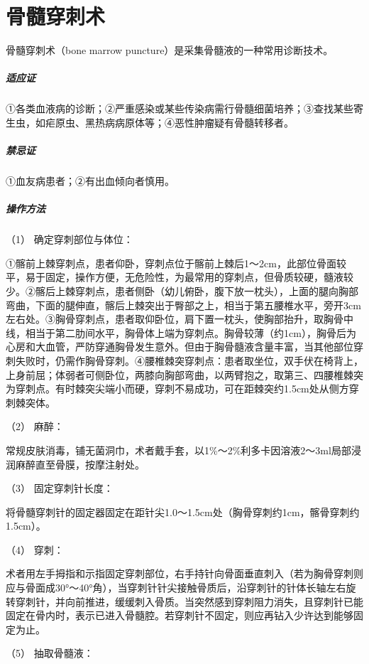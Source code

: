 \section{骨髓穿刺术}

骨髓穿刺术（bone marrow puncture）是采集骨髓液的一种常用诊断技术。

\subparagraph{适应证}

①各类血液病的诊断；②严重感染或某些传染病需行骨髓细菌培养；③查找某些寄生虫，如疟原虫、黑热病病原体等；④恶性肿瘤疑有骨髓转移者。

\subparagraph{禁忌证}

①血友病患者；②有出血倾向者慎用。

\subparagraph{操作方法}

\hypertarget{text00379.htmlux5cux23CHP16-7-3-3-1}{}
（1） 确定穿刺部位与体位：

①髂前上棘穿刺点，患者仰卧，穿刺点位于髂前上棘后1～2cm，此部位骨面较平，易于固定，操作方便，无危险性，为最常用的穿刺点，但骨质较硬，髓液较少。②髂后上棘穿刺点，患者侧卧（幼儿俯卧，腹下放一枕头），上面的腿向胸部弯曲，下面的腿伸直，髂后上棘突出于臀部之上，相当于第五腰椎水平，旁开3cm左右处。③胸骨穿刺点，患者取仰卧位，肩下置一枕头，使胸部抬升，取胸骨中线，相当于第二肋间水平，胸骨体上端为穿刺点。胸骨较薄（约1cm），胸骨后为心房和大血管，严防穿通胸骨发生意外。但由于胸骨髓液含量丰富，当其他部位穿刺失败时，仍需作胸骨穿刺。④腰椎棘突穿刺点：患者取坐位，双手伏在椅背上，上身前屈；体弱者可侧卧位，两膝向胸部弯曲，以两臂抱之，取第三、四腰椎棘突为穿刺点。有时棘突尖端小而硬，穿刺不易成功，可在距棘突约1.5cm处从侧方穿刺棘突体。

\hypertarget{text00379.htmlux5cux23CHP16-7-3-3-2}{}
（2） 麻醉：

常规皮肤消毒，铺无菌洞巾，术者戴手套，以1\%～2\%利多卡因溶液2～3ml局部浸润麻醉直至骨膜，按摩注射处。

\hypertarget{text00379.htmlux5cux23CHP16-7-3-3-3}{}
（3） 固定穿刺针长度：

将骨髓穿刺针的固定器固定在距针尖1.0～1.5cm处（胸骨穿刺约1cm，髂骨穿刺约1.5cm）。

\hypertarget{text00379.htmlux5cux23CHP16-7-3-3-4}{}
（4） 穿刺：

术者用左手拇指和示指固定穿刺部位，右手持针向骨面垂直刺入（若为胸骨穿刺则应与骨面成30°～40°角），当穿刺针针尖接触骨质后，沿穿刺针的针体长轴左右旋转穿刺针，并向前推进，缓缓刺入骨质。当突然感到穿刺阻力消失，且穿刺针已能固定在骨内时，表示已进入骨髓腔。若穿刺针不固定，则应再钻入少许达到能够固定为止。

\hypertarget{text00379.htmlux5cux23CHP16-7-3-3-5}{}
（5） 抽取骨髓液：

